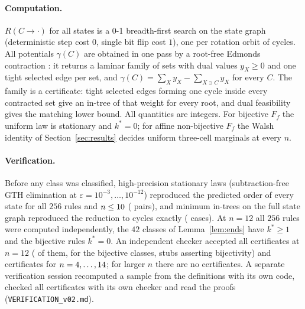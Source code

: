 \documentclass[11pt,a4paper]{article}
\theoremstyle{remark}
\newcommand{\eps}{\varepsilon}
\begin{document}
\paragraph{Computation.} $R(C\to\cdot)$ for all states is a 0-1 breadth-first search on the state graph (deterministic step cost $0$, single bit flip cost $1$), one per rotation orbit of cycles. All potentials $\gamma(C)$ are obtained in one pass by a root-free Edmonds contraction \citep{Edmonds1967}: it returns a laminar family of sets with dual values $y_X\ge0$ and one tight selected edge per set, and $\gamma(C)=\sum_Xy_X-\sum_{X\ni C}y_X$ for every $C$. The family is a certificate: tight selected edges forming one cycle inside every contracted set give an in-tree of that weight for every root, and dual feasibility gives the matching lower bound. All quantities are integers. For bijective $F_f$ the uniform law is stationary and $k^*=0$; for affine non-bijective $F_f$ the Walsh identity of Section~\ref{sec:results} decides uniform three-cell marginals at every $n$.

\paragraph{Verification.} Before any class was classified, high-precision stationary laws (subtraction-free GTH elimination at $\eps=10^{-3},\dots,10^{-12}$) reproduced the predicted order of every state for all $256$ rules and $n\le10$ (\VerifyRows{} pairs), and minimum in-trees on the full state graph reproduced the reduction to cycles exactly (\VerifyTreesRows{} cases). At $n=12$ all $256$ rules were computed independently, the $42$ classes of Lemma~\ref{lem:ends} have $k^*\ge1$ and the bijective rules $k^*=0$. An independent checker accepted all \CertsNtwelve{} certificates at $n=12$ (\CertStubs{} of them, for the bijective classes, stubs asserting bijectivity) and \CertsSweep{} certificates for $n=4,\dots,14$; for larger $n$ there are no certificates. A separate verification session recomputed a sample from the definitions with its own code, checked all certificates with its own checker and read the proofs (\texttt{VERIFICATION\_v02.md}).
\end{document}
